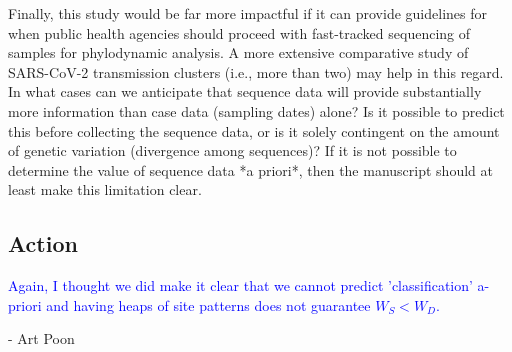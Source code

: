 \documentclass{article}
\begin{document}
Finally, this study would be far more impactful if it can provide guidelines for when public health agencies should proceed with fast-tracked sequencing of samples for phylodynamic analysis.  A more extensive comparative study of SARS-CoV-2 transmission clusters (i.e., more than two) may help in this regard.  In what cases can we anticipate that sequence data will provide substantially more information than case data (sampling dates) alone?  Is it possible to predict this before collecting the sequence data, or is it solely contingent on the amount of genetic variation (divergence among sequences)?  If it is not possible to determine the value of sequence data *a priori*, then the manuscript should at least make this limitation clear.

\subsection*{Action}
\textcolor{blue}{
Again, I thought we did make it clear that we cannot predict 'classification' a-priori and having heaps of site patterns does not guarantee $W_{S} < W_{D}$.}

- Art Poon
\end{document}
